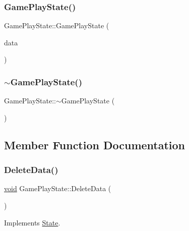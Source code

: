\subsubsection{\texorpdfstring{Game\+Play\+State()}{GamePlayState()}}
{\footnotesize\ttfamily Game\+Play\+State\+::\+Game\+Play\+State (\begin{DoxyParamCaption}\item[{\hyperlink{structGameData}{Game\+Data} \&}]{data }\end{DoxyParamCaption})}

\mbox{\label{classGamePlayState_aaa1afd5f6e091e5cb5bda2fa82247d58}} 
\subsubsection{\texorpdfstring{$\sim$\+Game\+Play\+State()}{~GamePlayState()}}
{\footnotesize\ttfamily Game\+Play\+State\+::$\sim$\+Game\+Play\+State (\begin{DoxyParamCaption}{ }\end{DoxyParamCaption})}



\subsection{Member Function Documentation}
\mbox{\label{classGamePlayState_a8a393249f2deabe0fe8f236b4e58cb17}} 
\subsubsection{\texorpdfstring{Delete\+Data()}{DeleteData()}}
{\footnotesize\ttfamily \hyperlink{imgui__impl__opengl3__loader_8h_ac668e7cffd9e2e9cfee428b9b2f34fa7}{void} Game\+Play\+State\+::\+Delete\+Data (\begin{DoxyParamCaption}{ }\end{DoxyParamCaption})\hspace{0.3cm}{\ttfamily [virtual]}}



Implements \hyperlink{classState_ade502eaa386d570e526eb356ffd73fd8}{State}.

